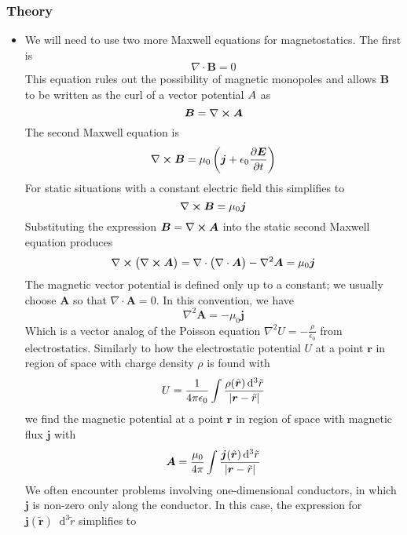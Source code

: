 \documentclass[11pt, a4paper]{article}
\newcommand{\diff}{\mathop{}\!\mathrm{d}} %
\renewcommand{\vec}[1]{\bm{#1}} %
\newcommand{\tvec}[1]{\tilde{\vec{#1}}} %
\renewcommand{\r}{\vec{r}}
\newcommand{\E}{\vec{E}} %
\newcommand{\B}{\vec{B}} %
\newcommand{\A}{\vec{A}} %
\newcommand{\e}{\epsilon_{0}} %
\renewcommand{\div}{\nabla \cdot}
\renewcommand{\curl}{\nabla \cross}
\renewcommand{\laplacian}{\nabla^{2}}
\begin{document}
\subsubsection{Theory}
\begin{itemize}
	\item We will need to use two more Maxwell equations for magnetostatics. The first is
	\begin{equation*}
		\div \B = 0
	\end{equation*}
	This equation rules out the possibility of magnetic monopoles and allows $ \B $ to be written as the curl of a vector potential $ \\A $ as
	\begin{equation*}
		\B = \curl \A
	\end{equation*}
	The second Maxwell equation is 
	\begin{equation*}
		\curl \B = \mu_{0}\left(\vec{j} + \e \pdv{\E}{t}\right)
	\end{equation*}
	For static situations with a constant electric field this simplifies to
	\begin{equation*}
		\curl \B = \mu_{0}\vec{j}
	\end{equation*}
	Substituting the expression $ \B = \curl \A $ into the static second Maxwell equation produces
	\begin{equation*}
		\curl \big(\curl \A\big) = \div \big(\div \A\big) - \laplacian \A = \mu_{0} \vec{j}
	\end{equation*}
	The magnetic vector potential is defined only up to a constant; we usually choose $ \A $ so that $ \div \A = 0 $. In this convention, we have
	\begin{equation*}
		\laplacian \A = - \mu_{0}\vec{j}
	\end{equation*}
	Which is a vector analog of the Poisson equation $ \laplacian U = - \frac{\rho}{\e} $ from electrostatics. Similarly to how the electrostatic potential $ U $ at a point $ \r $ in region of space with charge density $ \rho $ is found with
	\begin{equation*}
		U = \frac{1}{4 \pi \e} \int \frac{\rho(\tvec{r})\diff^{3}\tilde{r}}{\abs{\r - \tilde{r}}}
	\end{equation*}
	we find the magnetic potential at a point $ \r $ in region of space with magnetic flux $ \vec{j} $ with
	\begin{equation*}
		\A = \frac{\mu_{0}}{4 \pi} \int \frac{\vec{j}(\tvec{r})\diff^{3}\tilde{r}}{\abs{\r - \tilde{r}}}
	\end{equation*}
	We often encounter problems involving one-dimensional conductors, in which $ \vec{j} $ is non-zero only along the conductor. In this case, the expression for $ \vec{j}(\tvec{r})\diff^{3}\tilde{r} $ simplifies to

\end{itemize}
\end{document}
